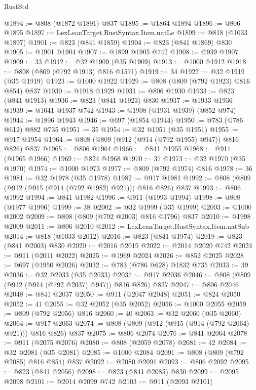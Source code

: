 \begin{lexlean}{RustStd}
\begin{coremodule}
@1894 := @808 (@1872 @1891) @837
@1895 := @1864 @1894
@1896 := @806 @1895
@1897 := LexLeanTarget.RustSyntax.Item.natLe
@1899 := @818 (@1033 @1897)
@1901 := @823 (@841 @1859)
@1904 := @823 (@841 @1869) @830
@1905 := @1901 @1904
@1907 := @1899 @1905 @742
@1908 := @939 @1907
@1909 := 33
@1912 := @32 @1909 (@35 @1909)
@1913 := @1000 @1912
@1918 := @808 (@809 (@792 @1913) @816 @1571)
@1919 := 34
@1922 := @32 @1919 (@35 @1919)
@1923 := @1000 @1922
@1929 := @808 (@809 (@792 @1923) @816 @854) @837
@1930 := @1918 @1929
@1931 := @806 @1930
@1933 := @823 (@841 @1913)
@1936 := @823 (@841 @1923) @830
@1937 := @1933 @1936
@1939 := @1641 @1937 @742
@1943 := @1908 (@1931 @1939) (@852 @974)
@1944 := @1896 @1943
@1946 := @697 (@1854 @1944)
@1950 := @783 (@786 @612) @882 @735
@1951 := 35
@1954 := @32 @1951 (@35 @1951)
@1955 := @917 @1954
@1964 := @808 (@809 (@912 (@914 (@792 @1955) @947)) @816 @826) @837
@1965 := @806 @1964
@1966 := @841 @1955
@1968 := @911 (@1965 @1966)
@1969 := @824 @1968
@1970 := 37
@1973 := @32 @1970 (@35 @1970)
@1974 := @1000 @1973
@1977 := @809 (@792 @1974) @816
@1978 := 36
@1981 := @32 @1978 (@35 @1978)
@1982 := @917 @1981
@1992 := @808 (@809 (@912 (@915 (@914 (@792 @1982) @921))) @816 @826) @837
@1993 := @806 @1992
@1994 := @841 @1982
@1996 := @911 (@1993 @1994)
@1998 := @808 (@1977 @1996)
@1999 := 38
@2002 := @32 @1999 (@35 @1999)
@2003 := @1000 @2002
@2009 := @808 (@809 (@792 @2003) @816 @1796) @837
@2010 := @1998 @2009
@2011 := @806 @2010
@2012 := LexLeanTarget.RustSyntax.Item.natSub
@2014 := @818 (@1033 @2012)
@2016 := @823 (@841 @1974)
@2019 := @823 (@841 @2003) @830
@2020 := @2016 @2019
@2022 := @2014 @2020 @742
@2024 := @911 (@2011 @2022)
@2025 := @1969 @2024
@2026 := @852 @2025
@2028 := @697 (@1950 @2026)
@2032 := @783 (@786 @628) @1832 @735
@2033 := 39
@2036 := @32 @2033 (@35 @2033)
@2037 := @917 @2036
@2046 := @808 (@809 (@912 (@914 (@792 @2037) @947)) @816 @826) @837
@2047 := @806 @2046
@2048 := @841 @2037
@2050 := @911 (@2047 @2048)
@2051 := @824 @2050
@2052 := 41
@2055 := @32 @2052 (@35 @2052)
@2056 := @1000 @2055
@2059 := @809 (@792 @2056) @816
@2060 := 40
@2063 := @32 @2060 (@35 @2060)
@2064 := @917 @2063
@2074 := @808 (@809 (@912 (@915 (@914 (@792 @2064) @921))) @816 @826) @837
@2075 := @806 @2074
@2076 := @841 @2064
@2078 := @911 (@2075 @2076)
@2080 := @808 (@2059 @2078)
@2081 := 42
@2084 := @32 @2081 (@35 @2081)
@2085 := @1000 @2084
@2091 := @808 (@809 (@792 @2085) @816 @854) @837
@2092 := @2080 @2091
@2093 := @806 @2092
@2095 := @823 (@841 @2056)
@2098 := @823 (@841 @2085) @830
@2099 := @2095 @2098
@2101 := @2014 @2099 @742
@2103 := @911 (@2093 @2101)

\end{coremodule}
\end{lexlean}

